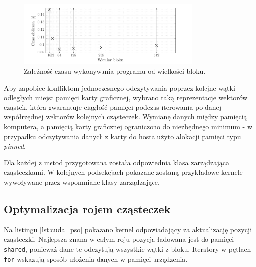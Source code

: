 \documentclass[11pt, a4paper, oneside]{article}
\begin{document}
\begin{figure}[H]
\centering
	\includegraphics[width=0.8\textwidth]{grafiki/blocksizeplot.pdf}{\caption{Zależność czasu wykonywania programu od wielkości bloku.}\label{fig:blocksize}}
	
\end{figure}

Aby zapobiec konfliktom jednoczesnego odczytywania poprzez kolejne wątki odległych miejsc pamięci karty graficznej, wybrano taką reprezentacje wektorów cząstek, która gwarantuje ciągłość pamięci podczas iterowania po danej współrzędnej wektorów kolejnych cząsteczek. Wymianę danych między pamięcią komputera, a pamięcią karty graficznej ograniczono do niezbędnego minimum - w przypadku odczytywania danych z karty do hosta użyto alokacji pamięci typu \textit{pinned}.

Dla każdej z metod przygotowana została odpowiednia klasa zarządzająca cząsteczkami. W kolejnych podsekcjach pokazane zostaną przykładowe kernele wywoływane przez wspomniane  klasy zarządzające.

\subsection{Optymalizacja rojem cząsteczek}
Na listingu \ref{lst:cuda_pso} pokazano kernel odpowiadający za aktualizację pozycji cząsteczki. Najlepsza znana w całym roju pozycja ładowana jest do pamięci \lstinline[style=mycpp]{shared}, ponieważ dane te odczytują wszystkie wątki z bloku. Iteratory w pętlach \lstinline[style=mycpp]{for} wskazują sposób ułożenia danych w pamięci urządzenia.
\end{document}
